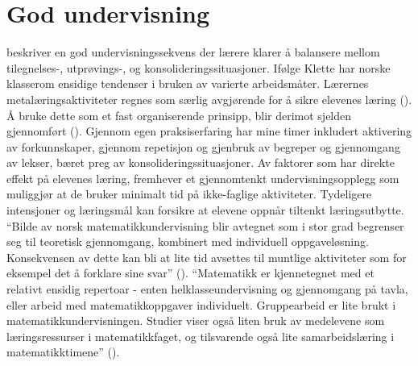 \documentclass[12pt,twoside,onecolumn,norsk]{article}
\begin{document}
\section*{God undervisning}
 beskriver en god undervisningssekvens der lærere klarer å balansere mellom 
tilegnelses-, utprøvings-, og konsolideringssituasjoner. Ifølge Klette har norske klasserom ensidige 
tendenser i bruken av varierte arbeidsmåter. Lærernes metalæringsaktiviteter regnes som særlig 
avgjørende for å sikre elevenes læring (). Å bruke dette som et fast 
organiserende prinsipp, blir derimot sjelden gjennomført (). Gjennom egen 
praksiserfaring har mine timer inkludert aktivering av forkunnskaper, gjennom repetisjon og
gjenbruk av begreper og gjennomgang av lekser, bæret preg av konsolideringssituasjoner.
\newline
\newline
Av faktorer som har direkte effekt på elevenes læring, fremhever  et 
gjennomtenkt undervisningsopplegg som muliggjør at de bruker minimalt tid på ikke-faglige 
aktiviteter. Tydeligere intensjoner og læringsmål kan forsikre at elevene oppnår tiltenkt 
læringsutbytte.
\newline
\newline
``Bilde av norsk matematikkundervisning blir avtegnet som i stor grad begrenser seg til 
teoretisk gjennomgang, kombinert med individuell oppgaveløsning. Konsekvensen av dette 
kan bli at lite tid avsettes til muntlige aktiviteter som for eksempel det å forklare 
sine svar'' (). ``Matematikk er kjennetegnet med et relativt 
ensidig repertoar - enten helklasseundervisning og gjennomgang på tavla, eller arbeid 
med matematikkoppgaver individuelt. Gruppearbeid er lite brukt i matematikkundervisningen. 
Studier viser også liten bruk av medelevene som læringsressurser i matematikkfaget, og 
tilsvarende også lite samarbeidslæring i matematikktimene'' ().
\end{document}
